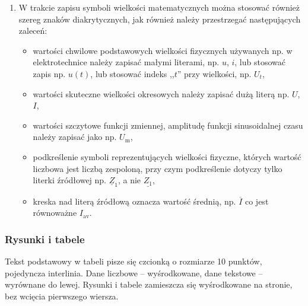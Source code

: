 \documentclass[12pt,twoside,openright]{article}
\begin{document}
\begin{enumerate}[label=\arabic*), leftmargin=1.25cm]
\begin{itemize}[label={--},labelsep=0.4cm,leftmargin=0.6cm]
\item jednostek nie należy umieszczać w nawiasach kwadratowych, np. $I=1$ $\mathrm{[A]}$. Odstępstwem od tej zasady mogą być tabele, nagłówki kolumn, opisy osi na wykresach oraz w sporadycznych sytuacjach we wzorach matematycznych (ale tylko wówczas, gdy zależność matematyczna nie wskazuje w~jakiej jednostce wystąpi wartość liczbowa). Przykłady odstępstw zamieszczono w~podrozdziale \ref{Subsec:Rysunki-i-tabele}.   

\end{itemize}

\item W trakcie zapisu symboli wielkości matematycznych można stosować również szereg znaków diakrytycznych, jak również należy przestrzegać następujących zaleceń:

\begin{itemize}[label={--},labelsep=0.4cm,leftmargin=0.6cm]
\item wartości chwilowe podstawowych wielkości fizycznych używanych np. w elektrotechnice należy zapisać małymi literami, np. $u$, $i$, lub stosować zapis np. $u(t)$, lub stosować indeks ,,$t$'' przy wielkości, np. $U_t$,

\item wartości skuteczne wielkości okresowych należy zapisać dużą literą np. $U$, $I$, 

\item wartości szczytowe funkcji zmiennej, amplitudę funkcji sinusoidalnej czasu należy zapisać jako np. $U_\mathrm{m}$,

\item podkreślenie symboli reprezentujących wielkości fizyczne, których wartość liczbowa jest liczbą zespoloną, przy czym podkreślenie dotyczy tylko literki źródłowej np. $\underline{Z}_1$, a nie $\underline{Z_1}$,

\item kreska nad literą źródłową oznacza wartość średnią, np. $\overline{I}$ co jest równoważne $I_\mathrm{av}$.

\end{itemize}

\end{enumerate}




\subsubsection{Rysunki i tabele}
\label{Subsec:Rysunki-i-tabele}
Tekst podstawowy w tabeli pisze się czcionką o rozmiarze 10 punktów, pojedyncza interlinia. Dane liczbowe -- wyśrodkowane, dane tekstowe -- wyrównane do lewej. Rysunki i tabele zamieszcza się wyśrodkowane na stronie, bez wcięcia pierwszego wiersza.
\end{document}
